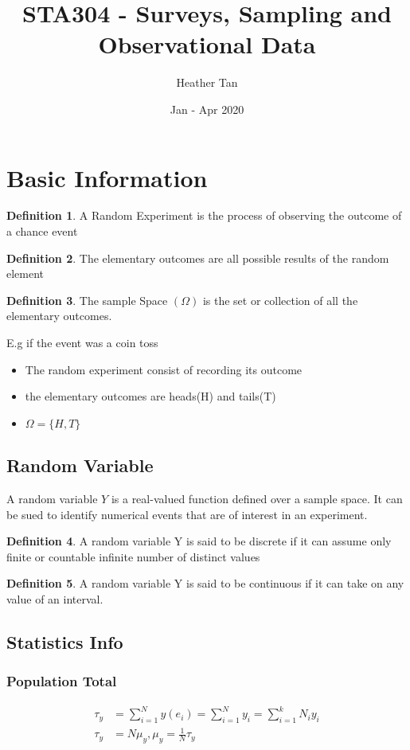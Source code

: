 \documentclass{article}
\title{STA304 - Surveys, Sampling and Observational Data}
\author{Heather Tan}
\date{Jan - Apr 2020}
\theoremstyle{definition}
\newtheorem{definition}{Definition}[section]
\theoremstyle{thrm}
\theoremstyle{lma}
\theoremstyle{ppst}
\theoremstyle{crlr}
\begin{document}
\maketitle	
\tableofcontents
\pagebreak

\section{Basic Information}
\begin{definition}
	A Random Experiment is the process of observing the outcome of a chance event
\end{definition}
\begin{definition}
	The elementary outcomes are all possible results of the random element
\end{definition}
\begin{definition}
	The sample Space $(\Omega)$ is the set or collection of all the elementary outcomes. 
\end{definition}
E.g if the event was a coin toss
\begin{itemize}
	\item The random experiment consist of recording its outcome
	\item the elementary outcomes are heads(H) and tails(T) 
	\item $\Omega = \{H,T\}$
\end{itemize}
\subsection{Random Variable}
A random variable $Y$ is a real-valued function defined over a sample space. It can be sued to identify numerical events that are of interest in an experiment.
\begin{definition}
	A random variable Y is said to be discrete if it can assume only finite or countable infinite number of distinct values
\end{definition}
\begin{definition}
	A random variable Y is said to be continuous if it can take on any value of an interval.
\end{definition}

\subsection{Statistics Info}
\subsubsection{Population Total}
\begin{align*}
	\tau_y &= \sum_{i=1}^N y(e_i) = \sum_{i=1}^N y_i = \sum_{i=1}^k N_iy_i\\
	\tau_y &= N \mu_y, \mu_y = \frac{1}{N}\tau_y
\end{align*}
\end{document}
